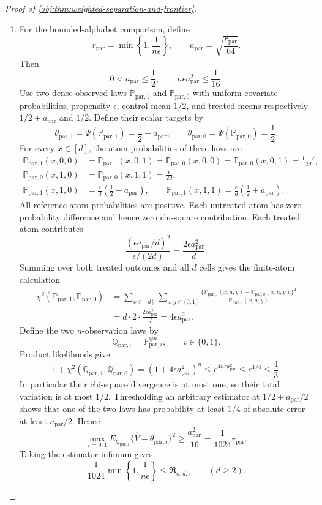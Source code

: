 \begin{proof}[Proof of \cref{obj:thm:weighted-separation-and-frontier}]
\begin{enumerate}
\item
For the bounded-alphabet comparison, define
\[
r_{\mathrm{par}}=\min\left\{1,\frac1{n\epsilon}\right\},
\qquad
a_{\mathrm{par}}=\sqrt{\frac{r_{\mathrm{par}}}{64}}.
\]
Then
\[
0<a_{\mathrm{par}}\le\frac12,
\qquad
n\epsilon a_{\mathrm{par}}^2\le\frac1{16}.
\]
Use two dense observed laws \(\mathbb P_{\mathrm{par},1}\) and
\(\mathbb P_{\mathrm{par},0}\) with uniform covariate probabilities, propensity
\(\epsilon\), control mean \(1/2\), and treated means respectively
\(1/2+a_{\mathrm{par}}\) and \(1/2\). Define their scalar targets by
\[
\theta_{\mathrm{par},1}
=\Psi(\mathbb P_{\mathrm{par},1})=\frac12+a_{\mathrm{par}},
\qquad
\theta_{\mathrm{par},0}
=\Psi(\mathbb P_{\mathrm{par},0})=\frac12.
\]
For every \(x\in[d]\), the atom probabilities of these laws are
\[
\begin{aligned}
\mathbb P_{\mathrm{par},1}(x,0,0)
&=\mathbb P_{\mathrm{par},1}(x,0,1)
=\mathbb P_{\mathrm{par},0}(x,0,0)
=\mathbb P_{\mathrm{par},0}(x,0,1)
=\frac{1-\epsilon}{2d},\\
\mathbb P_{\mathrm{par},0}(x,1,0)
&=\mathbb P_{\mathrm{par},0}(x,1,1)=\frac{\epsilon}{2d},\\
\mathbb P_{\mathrm{par},1}(x,1,0)
&=\frac{\epsilon}{d}\left(\frac12-a_{\mathrm{par}}\right),
\qquad
\mathbb P_{\mathrm{par},1}(x,1,1)
=\frac{\epsilon}{d}\left(\frac12+a_{\mathrm{par}}\right).
\end{aligned}
\]
All reference atom probabilities are positive. Each untreated atom has zero probability difference and hence zero chi-square contribution. Each treated atom contributes
\[
\frac{(\epsilon a_{\mathrm{par}}/d)^2}{\epsilon/(2d)}
=\frac{2\epsilon a_{\mathrm{par}}^2}{d}.
\]
Summing over both treated outcomes and all \(d\) cells gives the finite-atom calculation
\[
\begin{aligned}
\chi^2(\mathbb P_{\mathrm{par},1},\mathbb P_{\mathrm{par},0})
&=\sum_{x\in[d]}\sum_{a,y\in\{0,1\}}
\frac{\{\mathbb P_{\mathrm{par},1}(x,a,y)
-\mathbb P_{\mathrm{par},0}(x,a,y)\}^2}
 {\mathbb P_{\mathrm{par},0}(x,a,y)}\\
&=d\cdot2\cdot\frac{2\epsilon a_{\mathrm{par}}^2}{d}
=4\epsilon a_{\mathrm{par}}^2.
\end{aligned}
\]
Define the two \(n\)-observation laws by
\[
\mathbb Q_{\mathrm{par},\iota}
=\mathbb P_{\mathrm{par},\iota}^{\otimes n},
\qquad \iota\in\{0,1\}.
\]
Product likelihoods give
\[
1+\chi^2(\mathbb Q_{\mathrm{par},1},\mathbb Q_{\mathrm{par},0})
=(1+4\epsilon a_{\mathrm{par}}^2)^n
\le e^{4n\epsilon a_{\mathrm{par}}^2}
\le e^{1/4}\le\frac43.
\]
In particular their chi-square divergence is at most one, so their total variation is at most \(1/2\). Thresholding an arbitrary estimator at
\(1/2+a_{\mathrm{par}}/2\) shows that one of the two laws has probability at least \(1/4\) of absolute error at least \(a_{\mathrm{par}}/2\). Hence
\[
\max_{\iota=0,1}
E_{\mathbb Q_{\mathrm{par},\iota}}
\{\widehat V-\theta_{\mathrm{par},\iota}\}^2
\ge\frac{a_{\mathrm{par}}^2}{16}
=\frac1{1024}r_{\mathrm{par}}.
\]
Taking the estimator infimum gives
\[
\frac1{1024}\min\left\{1,\frac1{n\epsilon}\right\}
\le\mathfrak R_{n,d,\epsilon}
\qquad(d\ge2).
\]


\end{enumerate}
\end{proof}
